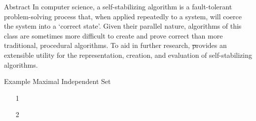 \documentclass{beamer}
\begin{document}
\begin{frame}[fragile,t]
  \maketitle
  \vspace{1in}
  \begin{columns}[t]
    \begin{column}{.45\textwidth}
      \begin{block}{Abstract}
        In computer science,
            a self-stabilizing algorithm is
            a fault-tolerant problem-solving process that,
            when applied repeatedly to a system,
            will coerce the system into a ‘correct state’.
        Given their parallel nature,
            algorithms of this class are sometimes more difficult
            to create and prove correct than
            more traditional, procedural algorithms.
        To aid in further research,
            \st provides an extensible utility for
            the representation, creation, and evaluation
            of self-stabilizing algorithms.
      \end{block}

      \begin{block}{Example \Dash Maximal Independent Set}
        \begin{minipage}[b]{4in}
          \begin{enumerate}
            \large
          \item[1]
          \item[2]
\end{enumerate}
\end{minipage}
\end{block}
\end{column}
\end{columns}
\end{frame}
\end{document}
